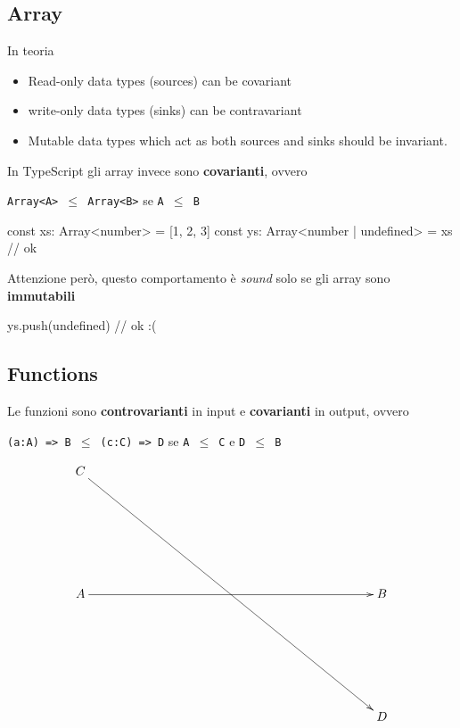 \documentclass[12pt]{article}
\theoremstyle{definition}
\newenvironment{code}
  {\vspace{0.5cm} \VerbatimEnvironment\begin{typescriptcode}}
  {\end{typescriptcode} \vspace{0.2cm}}
\begin{document}
\subsection{Array}

In teoria

\begin{itemize}
  \item Read-only data types (sources) can be covariant
  \item write-only data types (sinks) can be contravariant
  \item Mutable data types which act as both sources and sinks should be invariant.
\end{itemize}

In TypeScript gli array invece sono \textbf{covarianti}, ovvero

\texttt{Array<A> $\leq$ Array<B>} se \texttt{A $\leq$ B}

\begin{code}
const xs: Array<number> = [1, 2, 3]
const ys: Array<number | undefined> = xs // ok
\end{code}

Attenzione però, questo comportamento è \emph{sound} solo se gli array sono \textbf{immutabili}

\begin{code}
ys.push(undefined) // ok :(
\end{code}

\subsection{Functions}

Le funzioni sono \textbf{controvarianti} in input e \textbf{covarianti} in output, ovvero

\texttt{(a:A) => B $\leq$ (c:C) => D} se \texttt{A $\leq$ C} e \texttt{D $\leq$ B}

\[
\xymatrixrowsep{3cm}
\xymatrixcolsep{8cm}
\xymatrix{
  C \ar[rdd] \\
  A \ar[r] & B \\
    & D \\
}
\]
\end{document}
